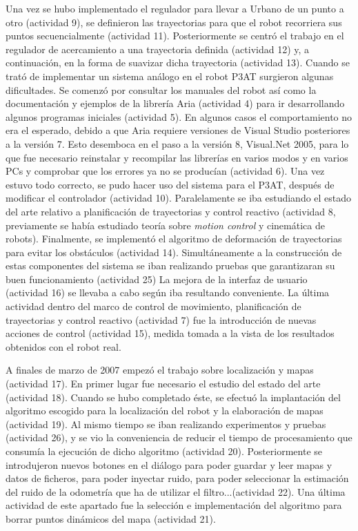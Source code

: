 Una vez se hubo implementado el regulador para llevar a Urbano de un punto a otro (actividad 9), se definieron las trayectorias para que el robot recorriera sus puntos secuencialmente (actividad 11). Posteriormente se centró el trabajo en el regulador de acercamiento a una trayectoria definida (actividad 12) y, a continuación, en la forma de suavizar dicha trayectoria (actividad 13). Cuando se trató de implementar un sistema análogo en el robot P3AT surgieron algunas dificultades. Se comenzó por consultar los manuales del robot así como la documentación y ejemplos de la librería Aria (actividad 4) para ir desarrollando algunos programas iniciales (actividad 5). En algunos casos el comportamiento no era el esperado, debido a que Aria requiere versiones de Visual Studio posteriores a la versión 7. Esto desemboca en el paso a la versión 8, Visual.Net 2005, para lo que fue necesario reinstalar y recompilar las librerías en varios modos y en varios PCs y comprobar que los errores ya no se producían (actividad 6). Una vez estuvo todo correcto, se pudo hacer uso del sistema para el P3AT, después de modificar el controlador (actividad 10). Paralelamente se iba estudiando el estado del arte relativo a planificación de trayectorias y control reactivo (actividad 8, previamente se había estudiado teoría sobre \emph{motion control} y cinemática de robots). Finalmente, se implementó el algoritmo de deformación de trayectorias para evitar los obstáculos (actividad 14). Simultáneamente a la construcción de estas componentes del sistema se iban realizando pruebas que garantizaran su buen funcionamiento (actividad 25) La mejora de la interfaz de usuario (actividad 16) se llevaba a cabo según iba resultando conveniente. La última actividad dentro del marco de control de movimiento, planificación de trayectorias y control reactivo (actividad 7) fue la introducción de nuevas acciones de control (actividad 15), medida tomada a la vista de los resultados obtenidos con el robot real.

A finales de marzo de 2007 empezó el trabajo sobre localización y mapas (actividad 17). En primer lugar fue necesario el estudio del estado del arte (actividad 18). Cuando se hubo completado éste, se efectuó la implantación del algoritmo escogido para la localización del robot y la elaboración de mapas (actividad 19). Al mismo tiempo se iban realizando experimentos y pruebas (actividad 26), y se vio la conveniencia de reducir el tiempo de procesamiento que consumía la ejecución de dicho algoritmo (actividad 20). Posteriormente se introdujeron nuevos botones en el diálogo para poder guardar y leer mapas y datos de ficheros, para poder inyectar ruido, para poder seleccionar la estimación del ruido de la odometría que ha de utilizar el filtro...(actividad 22). Una última actividad de este apartado fue la selección e implementación del algoritmo para borrar puntos dinámicos del mapa (actividad 21).

